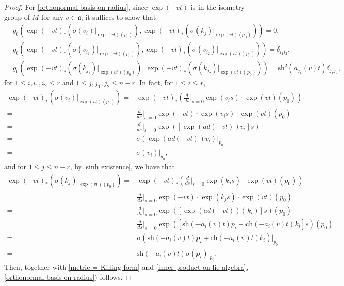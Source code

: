 \documentclass[12pt]{amsart}
\begin{document}
\begin{proof}
    For \eqref{orthonormal basis on radius}, since $\exp(-v t)$ is in the isometry group of $M$ for any $v\in \mathfrak{a}$, it suffices to show that 
    \begin{align*}
        &g_0(\exp(-vt)_*(\sigma(v_i)|_{\exp(vt)(p_0)}),\exp(-vt)_*(\sigma(k_j)|_{\exp(vt)(p_0)})) = 0,\\
        &g_0(\exp(-vt)_*(\sigma(v_{i_1})|_{\exp(vt)(p_0)}),\exp(-vt)_*(\sigma(v_{i_2})|_{\exp(vt)(p_0)})) = \delta_{i_1i_2},\\
        &g_0(\exp(-vt)_*(\sigma(k_{j_1})|_{\exp(vt)(p_0)}),\exp(-vt)_*(\sigma(k_{j_2})|_{\exp(vt)(p_0)})) = \mathrm{sh}^2(a_{j_1}(v)t)\delta_{j_1j_2}, 
    \end{align*}
    for $1 \leq i, i_1, i_2 \leq r$ and $1 \leq j, j_1, j_2 \leq n - r$. In fact, for $1 \leq i \leq r$, 
    \begin{align*}
        \exp(-vt)_*(\sigma(v_i)|_{\exp(vt)(p_0)}) 
        =& \exp(-vt)_*(\frac{d}{ds} \bigg|_{s = 0} \exp(v_is)\cdot\exp(vt)(p_0))\\
        =& \frac{d}{ds} \bigg|_{s = 0} \exp(-vt)\cdot\exp(v_is)\cdot \exp(vt)(p_0)\\
        =& \frac{d}{ds} \bigg|_{s = 0} \exp([\exp(ad(-vt))v_i]s)\\
        =& \sigma(\exp(ad(-vt))v_i)|_{p_0}\\
        =& \sigma(v_i)|_{p_0},
    \end{align*}
    and for $1\leq j \leq n - r$, by \eqref{sinh existence}, we have that 
    \begin{align*}
        \exp(-vt)_*(\sigma(k_j)|_{\exp(vt)(p_0)}) 
        =& \exp(-vt)_*(\frac{d}{ds}  \bigg|_{s = 0}  \exp(k_js) \cdot \exp(vt)(p_0))\\
        =& \frac{d}{ds} \bigg|_{s = 0} \exp(-vt)\cdot\exp(k_js)\cdot\exp(vt)(p_0)\\
        =& \frac{d}{ds} \bigg|_{s = 0} \exp([\exp(ad(-vt))(k_i)]s)(p_0)\\
        =& \frac{d}{ds} \bigg|_{s = 0} \exp([\mathrm{sh}(-a_i(v)t)p_i + \mathrm{ch}(-a_i(v)t)k_i]s)(p_0)\\
        =& \sigma(\mathrm{sh}(-a_i(v)t)p_i + \mathrm{ch}(-a_i(v)t)k_i)|_{p_0}\\
        =& \mathrm{sh}(-a_i(v)t)\sigma(p_i)|_{p_0}. 
    \end{align*}
    Then, together with \eqref{metric = Killing form} and \eqref{inner product on lie algebra}, \eqref{orthonormal basis on radius}) follows. 


\end{proof}
\end{document}
